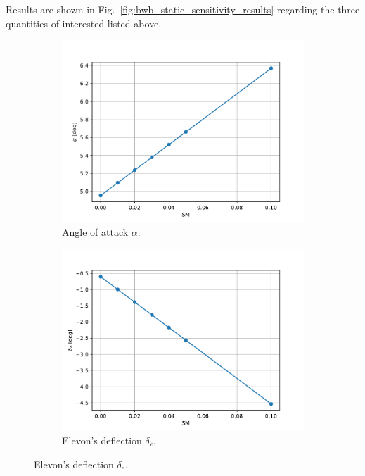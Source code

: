 Results are shown in Fig.~\ref{fig:bwb_static_sensitivity_results} regarding the three quantities of interested listed above. 
\begin{figure}[!h]
	\centering
	\begin{subfigure}{0.5\textwidth}
		\centering
		\includegraphics[keepaspectratio, width=\linewidth]{images/chap4/bwb_static_aoa}
		\caption{Angle of attack $\alpha$.}
		\label{fig:bwb_static_aoa_trim}
	\end{subfigure}
	\begin{subfigure}{0.5\textwidth}
		\centering
		\includegraphics[keepaspectratio, width=\linewidth]{images/chap4/bwb_static_elev_angle}
		\caption{Elevon's deflection $\delta_{e}$.}
		\label{fig:bwb_static_elev_angle_trim}

\end{subfigure}
\end{figure}
